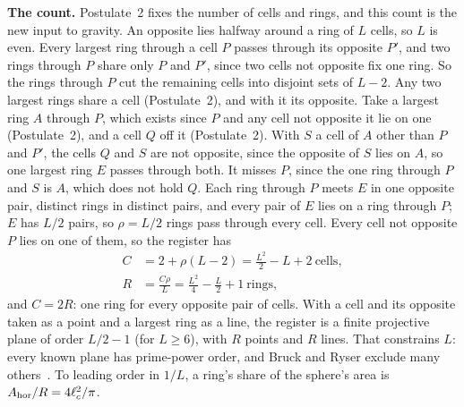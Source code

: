 \documentclass[aps,prd,twocolumn,superscriptaddress,nofootinbib,showkeys]{revtex4-2}
\newcommand{\lc}{\ell_c}
\begin{document}
\textbf{The count.} Postulate~2 fixes the number of cells and rings, and this count is the new input to gravity. An opposite lies halfway around a ring of $L$ cells, so $L$ is even. Every largest ring through a cell $P$ passes through its opposite $P'$, and two rings through $P$ share only $P$ and $P'$, since two cells not opposite fix one ring. So the rings through $P$ cut the remaining cells into disjoint sets of $L-2$. Any two largest rings share a cell (Postulate~2), and with it its opposite. Take a largest ring $A$ through $P$, which exists since $P$ and any cell not opposite it lie on one (Postulate~2), and a cell $Q$ off it (Postulate~2). With $S$ a cell of $A$ other than $P$ and $P'$, the cells $Q$ and $S$ are not opposite, since the opposite of $S$ lies on $A$, so one largest ring $E$ passes through both. It misses $P$, since the one ring through $P$ and $S$ is $A$, which does not hold $Q$. Each ring through $P$ meets $E$ in one opposite pair, distinct rings in distinct pairs, and every pair of $E$ lies on a ring through $P$; $E$ has $L/2$ pairs, so $\rho = L/2$ rings pass through every cell. Every cell not opposite $P$ lies on one of them, so the register has
\begin{equation}
\begin{split}
C &= 2 + \rho(L-2) = \frac{L^2}{2} - L + 2 \ \text{cells},\\
R &= \frac{C\rho}{L} = \frac{L^2}{4} - \frac{L}{2} + 1 \ \text{rings},
\end{split}
\label{eq:counts}
\end{equation}
and $C = 2R$: one ring for every opposite pair of cells. With a cell and its opposite taken as a point and a largest ring as a line, the register is a finite projective plane of order $L/2 - 1$ (for $L\ge6$), with $R$ points and $R$ lines. That constrains $L$: every known plane has prime-power order, and Bruck and Ryser exclude many others~\cite{bruck1949}. To leading order in $1/L$, a ring's share of the sphere's area is $A_{\rm hor}/R = 4\lc^2/\pi$.
\end{document}
